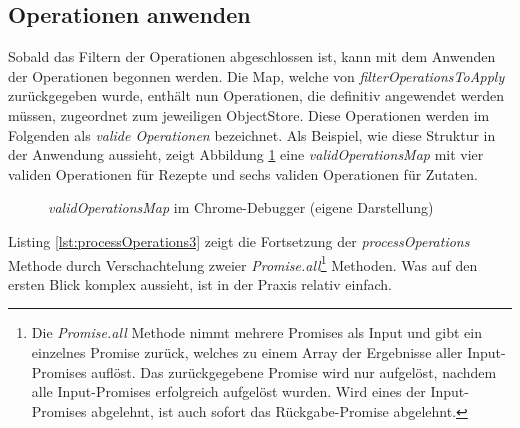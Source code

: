 \documentclass[a4paper, 12pt]{scrreprt}
\begin{document}
\subsection{Operationen anwenden}

Sobald das Filtern der Operationen abgeschlossen ist, kann mit dem Anwenden der Operationen begonnen werden. Die Map, welche von \textit{filterOperationsToApply} zurückgegeben wurde, enthält nun Operationen, die definitiv angewendet werden müssen, zugeordnet zum jeweiligen ObjectStore. Diese Operationen werden im Folgenden als \textit{valide Operationen} bezeichnet. Als Beispiel, wie diese Struktur in der Anwendung aussieht, zeigt Abbildung \ref{fig:validOperationsMapChrome} eine \textit{validOperationsMap} mit vier validen Operationen für Rezepte und sechs validen Operationen für Zutaten.

\begin{figure}[H]
	\centering
	\caption[\textit{validOperationsMap} im Chrome-Debugger]{\textit{validOperationsMap} im Chrome-Debugger (eigene Darstellung)}
	\label{fig:validOperationsMapChrome}
\end{figure}

Listing \ref{lst:processOperations3} zeigt die Fortsetzung der \textit{processOperations} Methode durch Verschachtelung zweier \textit{Promise.all}\footnote{Die \textit{Promise.all} Methode nimmt mehrere Promises als Input und gibt ein einzelnes Promise zurück, welches zu einem Array der Ergebnisse aller Input-Promises auflöst. Das zurückgegebene Promise wird nur aufgelöst, nachdem alle Input-Promises erfolgreich aufgelöst wurden. Wird eines der Input-Promises abgelehnt, ist auch sofort das Rückgabe-Promise abgelehnt.} Methoden. Was auf den ersten Blick komplex aussieht, ist in der Praxis relativ einfach.

\begin{minipage}{\linewidth}
	
\end{minipage}
\end{document}
